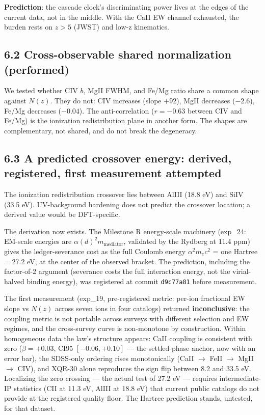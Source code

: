 \documentclass[11pt,a4paper]{article}
\begin{document}
\textbf{Prediction}: the cascade clock's discriminating power lives at the edges of the current data, not in the middle. With the CaII EW channel exhausted, the burden rests on $z > 5$ (JWST) and low-z kinematics.

\subsection*{6.2 Cross-observable shared normalization (performed)}

We tested whether CIV $b$, MgII FWHM, and Fe/Mg ratio share a common shape against $N(z)$. They do not: CIV increases (slope $+92$), MgII decreases ($-2.6$), Fe/Mg decreases ($-0.04$). The anti-correlation ($r = -0.63$ between CIV and Fe/Mg) is the ionization redistribution plane in another form. The shapes are complementary, not shared, and do not break the degeneracy.

\subsection*{6.3 A predicted crossover energy: derived, registered, first measurement attempted}

The ionization redistribution crossover lies between AlIII (18.8 eV) and SiIV (33.5 eV). UV-background hardening does not predict the crossover location; a derived value would be DFT-specific.

The derivation now exists. The Milestone R energy-scale machinery (exp\_24: EM-scale energies are $\alpha(d)^2 m_\text{mediator}$, validated by the Rydberg at 11.4 ppm) gives the ledger-severance cost as the full Coulomb energy $\alpha^2 m_e c^2$ = one Hartree = 27.2 eV, at the center of the observed bracket. The prediction, including the factor-of-2 argument (severance costs the full interaction energy, not the virial-halved binding energy), was registered at commit \texttt{d9c77a81} before measurement.

The first measurement (exp\_19, pre-registered metric: per-ion fractional EW slope vs $N(z)$ across seven ions in four catalogs) returned \textbf{inconclusive}: the coupling metric is not portable across surveys with different selection and EW regimes, and the cross-survey curve is non-monotone by construction. Within homogeneous data the law's structure appears: CaII coupling is consistent with zero ($\beta = +0.03$, CI95 $[-0.06, +0.10]$ — the settled-phase anchor, now with an error bar), the SDSS-only ordering rises monotonically (CaII $\to$ FeII $\to$ MgII $\to$ CIV), and XQR-30 alone reproduces the sign flip between 8.2 and 33.5 eV. Localizing the zero crossing — the actual test of 27.2 eV — requires intermediate-IP statistics (CII at 11.3 eV, AlIII at 18.8 eV) that current public catalogs do not provide at the registered quality floor. The Hartree prediction stands, untested, for that dataset.
\end{document}
